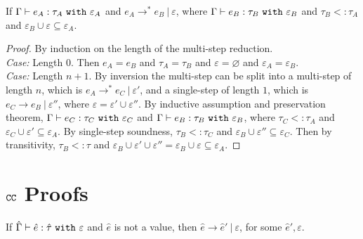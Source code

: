 \begin{appendix}
\hrulefill

\begin{theorem}
If $ \Gamma \vdash  e_A:  \tau_A~\mathtt{with}~ \varepsilon_A$ and $e_A \longrightarrow^{*} e_B~|~\varepsilon$, where $\Gamma \vdash e_B: \tau_B~\mathtt{with}~ \varepsilon_B$ and $ \tau_B <: \tau_A$ and $\varepsilon_B \cup \varepsilon \subseteq \varepsilon_A$.
\end{theorem}
\begin{proof} By induction on the length of the multi-step reduction.\\

\textit{Case:} Length $0$. Then $e_A = e_B$ and $\tau_A = \tau_B$ and $\varepsilon = \varnothing$ and $\varepsilon_A = \varepsilon_B$.\\

\textit{Case:} Length $n+1$. By inversion the multi-step can be split into a multi-step of length $n$, which is $ e_A \longrightarrow^{*}  e_C~|~\varepsilon'$, and a single-step of length $1$, which is $e_C \longrightarrow e_B~|~\varepsilon''$, where $\varepsilon = \varepsilon' \cup \varepsilon''$. By inductive assumption and preservation theorem, $ \Gamma \vdash  e_C:  \tau_C~\mathtt{with}~ \varepsilon_C$ and $ \Gamma \vdash  e_B:  \tau_B~\mathtt{with}~ \varepsilon_B$, where $ \tau_C <:  \tau_A$ and $ \varepsilon_C \cup \varepsilon' \subseteq \varepsilon_A$. By single-step soundness, $ \tau_B <:  \tau_C$ and $ \varepsilon_B \cup \varepsilon'' \subseteq \varepsilon_C$. Then by transitivity, $ \tau_B <:  \tau$ and $ \varepsilon_B \cup \varepsilon' \cup \varepsilon'' = \varepsilon_B \cup \varepsilon \subseteq \varepsilon_A$.
\end{proof}















\chapter{$\mathtt{CC}$ Proofs}\label{appendix:LAS File}

\begin{theorem}[Progress]
If $\hat \Gamma \vdash \hat e: \hat \tau~\mathtt{with}~ \varepsilon$ and $\hat e$ is not a value, then $\hat e \longrightarrow \hat e'~|~\varepsilon$, for some $\hat e', \varepsilon$.
\end{theorem}


\end{appendix}
